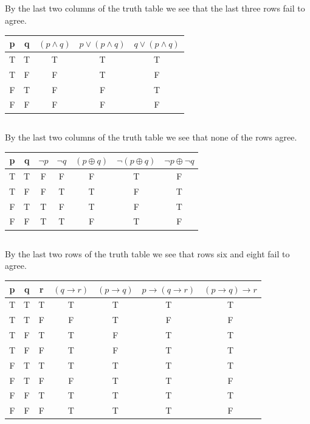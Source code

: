 \documentclass[11pt]{article}
\begin{document}
\subsection{} %
By the last two columns of the truth table we see that the last three rows fail to agree. 
\begin{center}
\begin{tabular}{ c|c|c|c|c } 
	p & q & $(p \land q)$ & $p \lor (p \land q)$ & $q \lor (p \land q)$ \\
	\hline
	T & T & T & T & T \\
	T & F & F & T & F \\
	F & T & F & F & T \\
	F & F & F & F & F \\
\end{tabular}
\end{center}

\subsection{} %
By the last two columns of the truth table we see that none of the rows agree.
\begin{center}
\begin{tabular}{ c|c|c|c|c|c|c } 
	p & q & $\neg{p}$ & $\neg{q}$ & $(p \oplus q)$ & $\neg{(p \oplus q)}$ & $\neg{p} \oplus \neg{q}$ \\
	\hline
	T & T & F & F & F & T & F \\
	T & F & F & T & T & F & T \\
	F & T & T & F & T & F & T \\
	F & F & T & T & F & T & F \\
\end{tabular}
\end{center}

\subsection{} %
By the last two rows of the truth table we see that rows six and eight fail to agree.
\begin{center}
\begin{tabular}{ c|c|c|c|c|c|c } 
	p & q & r & $(q \rightarrow r)$ & $(p \rightarrow q)$ & $p \rightarrow (q \rightarrow r)$ & $(p \rightarrow q) \rightarrow r$ \\
	\hline
	T & T & T & T & T & T & T \\ 
	T & T & F & F & T & F & F \\
	T & F & T & T & F & T & T \\
	T & F & F & T & F & T & T \\
	F & T & T & T & T & T & T \\
	F & T & F & F & T & T & F \\
	F & F & T & T & T & T & T \\
	F & F & F & T & T & T & F \\
\end{tabular}
\end{center}
\end{document}
